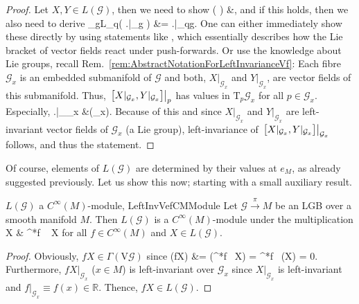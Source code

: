 \documentclass[a4paper,oneside,11pt,bibliography=totoc]{scrartcl}
\def\bas#1\eas{\begin{align*}#1\end{align*}}
\theoremstyle{plain}
\theoremstyle{remark}
\theoremstyle{definition}
\begin{document}
\begin{proof}
\leavevmode\newline
Let $X, Y \in L(\mathcal{G})$, then we need to show 
\bas
\mathrm{D}\pi\bigl( \mleft[ X, Y \mright] \bigr) &,
\eas
and if this holds, then we also need to derive
\bas
\mathrm{D}_gL_q\mleft( \mleft.\mleft[ X, Y \mright]\mright|_g \mright) &= \mleft.\mleft[ X, Y \mright]\mright|_{qg}.
\eas
One can either immediately show these directly by using statements like \cite[Proposition A.1.49; page 615]{Hamilton}, which essentially describes how the Lie bracket of vector fields react under push-forwards. Or use the knowledge about Lie groups, recall Rem.\ \ref{rem:AbstractNotationForLeftInvarianceVf}: Each fibre $\mathcal{G}_x$ is an embedded submanifold of $\mathcal{G}$ and both, $X|_{\mathcal{G}_x}$ and $Y|_{\mathcal{G}_x}$, are vector fields of this submanifold. Thus, $\mleft.\bigl[ X|_{\mathcal{G}_x}, Y|_{\mathcal{G}_x} \bigr]\mright|_p$ has values in $\mathrm{T}_p\mathcal{G}_x$ for all $p \in \mathcal{G}_x$. Especially,
\bas
\mleft.\mright|_{_x}
&\in {}(_x).
\eas
Because of this and since $X|_{\mathcal{G}_x}$ and $Y|_{\mathcal{G}_x}$ are left-invariant vector fields of $\mathcal{G}_x$ (a Lie group), left-invariance of $\mleft.\bigl[ X|_{\mathcal{G}_x}, Y|_{\mathcal{G}_x} \bigr]\mright|_{\mathcal{G}_x}$ follows, and thus the statement.
\end{proof}

Of course, elements of $L(\mathcal{G})$ are determined by their values at $e_M$, as already suggested previously. Let us show this now; starting with a small auxiliary result.

\begin{corollaries}{$L(\mathcal{G})$ a $C^\infty(M)$-module, \newline\cite[\S 3.5, comment before Lemma 3.5.5, page 122]{mackenzieGeneralTheory}}{LeftInvVefCMModule}
Let $\mathcal{G} \stackrel{\pi}{\to} M$ be an LGB over a smooth manifold $M$. Then $L(\mathcal{G})$ is a $C^\infty(M)$-module under the multiplication
\bas
fX
&\coloneqq
\pi^*f ~ X
\eas
for all $f \in C^\infty(M)$ and $X \in L(\mathcal{G})$.
\end{corollaries}

\begin{proof}
\leavevmode\newline
Obviously, $fX \in \Gamma(\mathrm{V}\mathcal{G})$ since
\bas
\mathrm{D}\pi(fX) &= \pi(\pi^*f~ X) = \pi^*f~ \pi(X) = 0.
\eas
Furthermore, $fX|_{\mathcal{G}_x}$ ($x \in M$) is left-invariant over $\mathcal{G}_x$ since $X|_{\mathcal{G}_x}$ is left-invariant and $f|_{\mathcal{G}_x} \equiv f(x) \in \mathbb{R}$. Thence, $fX \in L(\mathcal{G})$.
\end{proof}
\end{document}
